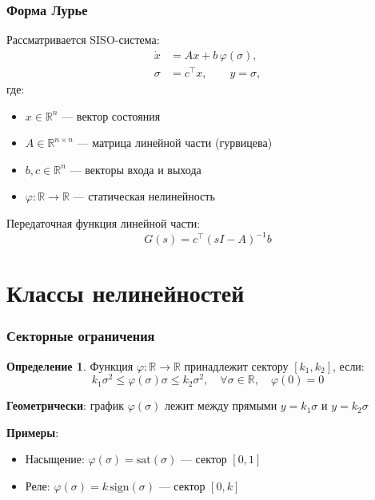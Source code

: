 \documentclass[14pt,aspectratio=169]{beamer}
\theoremstyle{definition}
\newtheorem{defn}{Определение}
\theoremstyle{plain}
\begin{document}
\begin{frame}
\frametitle{Форма Лурье}
Рассматривается SISO-система:
\begin{equation*}
    \begin{aligned}
        \dot x &= Ax + b\,\varphi(\sigma),\\
        \sigma &= c^\top x, \qquad y = \sigma,
    \end{aligned}
\end{equation*}
где:
\begin{itemize}
    \item $x\in\mathbb{R}^n$ — вектор состояния
    \item $A\in\mathbb{R}^{n\times n}$ — матрица линейной части (гурвицева)
    \item $b, c\in\mathbb{R}^n$ — векторы входа и выхода
    \item $\varphi:\mathbb{R}\to\mathbb{R}$ — статическая нелинейность
\end{itemize}

\vspace{10pt}
Передаточная функция линейной части:
\begin{equation*}
    G(s) = c^\top (sI - A)^{-1} b
\end{equation*}
\end{frame}

\section{Классы нелинейностей}

\begin{frame}
\frametitle{Секторные ограничения}
\begin{defn}
Функция $\varphi:\mathbb{R}\to\mathbb{R}$ принадлежит сектору $[k_1, k_2]$, если:
\begin{equation*}
    k_1\sigma^2 \le \varphi(\sigma)\sigma \le k_2\sigma^2, \quad \forall \sigma\in\mathbb{R}, \quad \varphi(0)=0
\end{equation*}
\end{defn}

\vspace{10pt}
\textbf{Геометрически}: график $\varphi(\sigma)$ лежит между прямыми $y=k_1\sigma$ и $y=k_2\sigma$

\vspace{10pt}
\textbf{Примеры}:
\begin{itemize}
    \item Насыщение: $\varphi(\sigma) = \mathrm{sat}(\sigma)$ — сектор $[0,1]$
    \item Реле: $\varphi(\sigma) = k\,\mathrm{sign}(\sigma)$ — сектор $[0,k]$
\end{itemize}
\end{frame}
\end{document}
